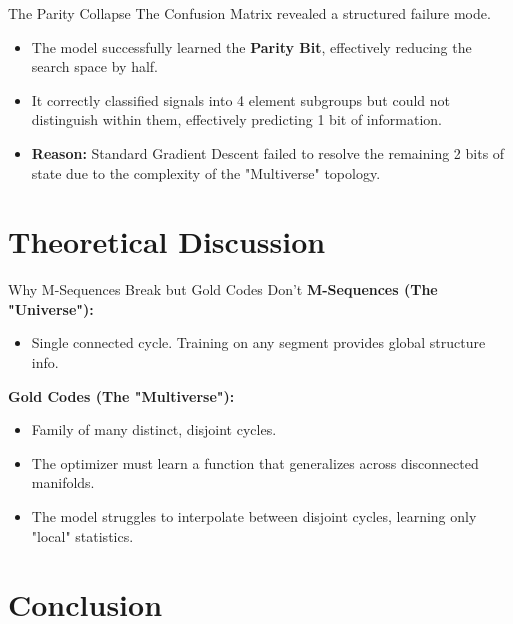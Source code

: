 \documentclass[aspectratio=169, 11pt]{beamer}
\begin{document}
\begin{frame}{The Parity Collapse}
    The Confusion Matrix revealed a structured failure mode.
    
    \begin{itemize}
        \item The model successfully learned the \textbf{Parity Bit}, effectively reducing the search space by half.
        \item It correctly classified signals into 4 element subgroups but could not distinguish within them, effectively predicting 1 bit of information.
        \item \textbf{Reason:} Standard Gradient Descent failed to resolve the remaining 2 bits of state due to the complexity of the "Multiverse" topology.
    \end{itemize}
\end{frame}

\section{Theoretical Discussion}

\begin{frame}{Why M-Sequences Break but Gold Codes Don't}
    \textbf{M-Sequences (The "Universe"):}
    \begin{itemize}
        \item Single connected cycle. Training on any segment provides global structure info.
    \end{itemize}
    
    \vspace{0.5em}
    \textbf{Gold Codes (The "Multiverse"):}
    \begin{itemize}
        \item Family of many distinct, disjoint cycles.
        \item The optimizer must learn a function that generalizes across disconnected manifolds.
        \item The model struggles to interpolate between disjoint cycles, learning only "local" statistics.
    \end{itemize}
\end{frame}

\section{Conclusion}
\end{document}
